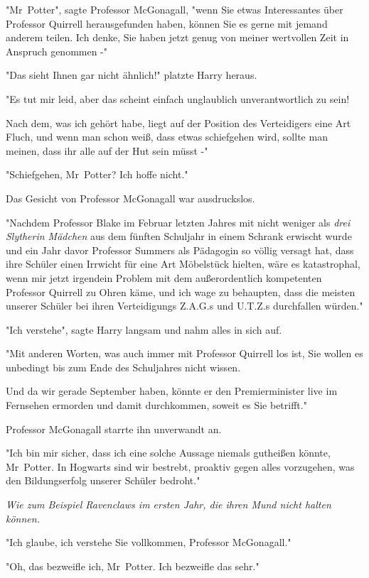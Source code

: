 {"Mr~Potter", sagte Professor McGonagall, "wenn Sie etwas Interessantes über Professor Quirrell herausgefunden haben, können Sie es gerne mit jemand anderem teilen. Ich denke, Sie haben jetzt genug von meiner wertvollen Zeit in Anspruch genommen -"

"Das sieht Ihnen gar nicht ähnlich!" platzte Harry heraus.

"Es tut mir leid, aber das scheint einfach unglaublich unverantwortlich zu sein!

Nach dem, was ich gehört habe, liegt auf der Position des Verteidigers eine Art Fluch, und wenn man schon weiß, dass etwas schiefgehen wird, sollte man meinen, dass ihr alle auf der Hut sein müsst -"

"Schiefgehen, Mr~Potter? Ich hoffe nicht."

Das Gesicht von Professor McGonagall war ausdruckslos.

"Nachdem Professor Blake im Februar letzten Jahres mit nicht weniger als \emph{drei Slytherin Mädchen} aus dem fünften Schuljahr in einem Schrank erwischt wurde und ein Jahr davor Professor Summers als Pädagogin so völlig versagt hat, dass ihre Schüler einen Irrwicht für eine Art Möbelstück hielten, wäre es katastrophal, wenn mir jetzt irgendein Problem mit dem außerordentlich kompetenten Professor Quirrell zu Ohren käme, und ich wage zu behaupten, dass die meisten unserer Schüler bei ihren Verteidigungs Z.A.G.s und U.T.Z.s durchfallen würden."

"Ich verstehe", sagte Harry langsam und nahm alles in sich auf.

"Mit anderen Worten, was auch immer mit Professor Quirrell los ist, Sie wollen es unbedingt bis zum Ende des Schuljahres nicht wissen.

Und da wir gerade September haben, könnte er den Premierminister live im Fernsehen ermorden und damit durchkommen, soweit es Sie betrifft."

Professor McGonagall starrte ihn unverwandt an.

"Ich bin mir sicher, dass ich eine solche Aussage niemals gutheißen könnte, Mr~Potter. In Hogwarts sind wir bestrebt, proaktiv gegen alles vorzugehen, was den Bildungserfolg unserer Schüler bedroht."

\emph{Wie zum Beispiel Ravenclaws im ersten Jahr, die ihren Mund nicht halten können.}

"Ich glaube, ich verstehe Sie vollkommen, Professor McGonagall."

"Oh, das bezweifle ich, Mr~Potter. Ich bezweifle das sehr."

}
